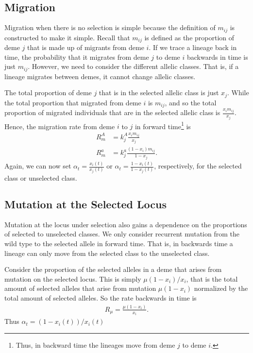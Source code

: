 \documentclass{article}
\begin{document}
\subsection{Migration} 

Migration when there is no selection is simple because the definition of $m_{ij}$
is constructed to make it simple. Recall that $m_{ij}$ is defined as the
proportion of deme $j$ that is made up of migrants from deme $i$. If we trace a
lineage back in time, the probability that it migrates from deme $j$ to deme $i$
backwards in time is just $m_{ij}$. However, we need to consider the different
allelic classes. That is, if a lineage migrates between demes, it cannot change
allelic classes.

The total proportion of deme $j$ that is in the selected allelic class is just
$x_j$. While the total proportion that migrated from deme $i$ is $m_{ij}$, and
so the total proportion of migrated individuals that are in the selected allelic
class is $\frac{x_i m_{ij}}{x_j}$. Hence, the migration rate from deme $i$ to
$j$ in forward time\footnote{Thus, in backward time the lineages move from
deme $j$ to deme $i$.} is
\begin{align}
	R_m^A&=k_j^A \frac{x_i m_{ij}}{x_j} \\
	R_m^a&=k_j^a \frac{(1-x_i) m_{ij}}{1-x_j}.
\end{align}
Again, we can now set $\alpha_t=\frac{x_i(t)}{x_j(t)}$ or
$\alpha_t=\frac{1-x_i(t)}{1-x_j(t)}$, respectively, for the selected class or
unselected class. 

\subsection{Mutation at the Selected Locus}

Mutation at the locus under selection also gains a dependence on the proportions
of selected to unselected classes. We only consider recurrent mutation from the
wild type to the selected allele in forward time. That is, in backwards time a
lineage can only move from the selected class to the unselected class.

Consider the proportion of the selected alleles in a deme that arises from
mutation on the selected locus. This is simply $\mu(1-x_i)/x_i$, that is the
total amount of selected alleles that arise from mutation $\mu (1-x_i)$
normalized by the total amount of selected alleles. So the rate backwards in
time is 
\begin{align}
	R_\mu=\frac{\mu (1-x_i)}{x_i}. 
\end{align}
Thus $\alpha_t=(1-x_i(t))/x_i(t)$
\end{document}

